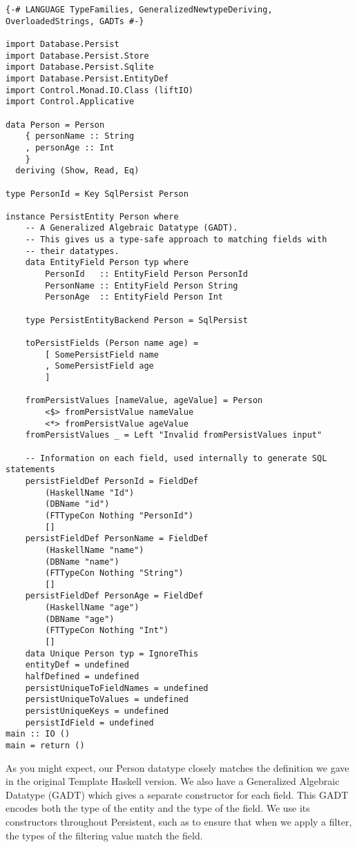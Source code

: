 \begin{lstlisting}
{-# LANGUAGE TypeFamilies, GeneralizedNewtypeDeriving, OverloadedStrings, GADTs #-}

import Database.Persist
import Database.Persist.Store
import Database.Persist.Sqlite
import Database.Persist.EntityDef
import Control.Monad.IO.Class (liftIO)
import Control.Applicative

data Person = Person
    { personName :: String
    , personAge :: Int
    }
  deriving (Show, Read, Eq)

type PersonId = Key SqlPersist Person

instance PersistEntity Person where
    -- A Generalized Algebraic Datatype (GADT).
    -- This gives us a type-safe approach to matching fields with
    -- their datatypes.
    data EntityField Person typ where
        PersonId   :: EntityField Person PersonId
        PersonName :: EntityField Person String
        PersonAge  :: EntityField Person Int

    type PersistEntityBackend Person = SqlPersist

    toPersistFields (Person name age) =
        [ SomePersistField name
        , SomePersistField age
        ]

    fromPersistValues [nameValue, ageValue] = Person
        <$> fromPersistValue nameValue
        <*> fromPersistValue ageValue
    fromPersistValues _ = Left "Invalid fromPersistValues input"

    -- Information on each field, used internally to generate SQL statements
    persistFieldDef PersonId = FieldDef
        (HaskellName "Id")
        (DBName "id")
        (FTTypeCon Nothing "PersonId")
        []
    persistFieldDef PersonName = FieldDef
        (HaskellName "name")
        (DBName "name")
        (FTTypeCon Nothing "String")
        []
    persistFieldDef PersonAge = FieldDef
        (HaskellName "age")
        (DBName "age")
        (FTTypeCon Nothing "Int")
        []
    data Unique Person typ = IgnoreThis
    entityDef = undefined
    halfDefined = undefined
    persistUniqueToFieldNames = undefined
    persistUniqueToValues = undefined
    persistUniqueKeys = undefined
    persistIdField = undefined
main :: IO ()
main = return ()
\end{lstlisting}%

As you might expect, our Person datatype closely matches the definition we gave in the original Template Haskell version. We also have a Generalized Algebraic Datatype (GADT) which gives a separate constructor for each field. This GADT encodes both the type of the entity and the type of the field. We use its constructors throughout Persistent, such as to ensure that when we apply a filter, the types of the filtering value match the field.

